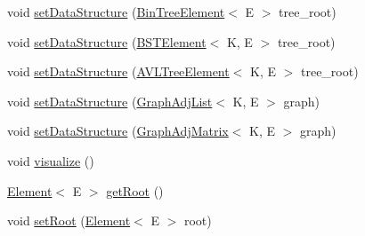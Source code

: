 \begin{DoxyCompactItemize}
void \hyperlink{classbridges_1_1connect_1_1_bridges_a02a3d74b381473b5d97a8f8194df9b40}{set\+Data\+Structure} (\hyperlink{classbridges_1_1base_1_1_bin_tree_element}{Bin\+Tree\+Element}$<$ E $>$ tree\+\_\+root)
\item 
void \hyperlink{classbridges_1_1connect_1_1_bridges_adb01a9385de48ef267bdfd22758fb361}{set\+Data\+Structure} (\hyperlink{classbridges_1_1base_1_1_b_s_t_element}{B\+S\+T\+Element}$<$ K, E $>$ tree\+\_\+root)
\item 
void \hyperlink{classbridges_1_1connect_1_1_bridges_a702c3f88840e100ad0182110627e60f5}{set\+Data\+Structure} (\hyperlink{classbridges_1_1base_1_1_a_v_l_tree_element}{A\+V\+L\+Tree\+Element}$<$ K, E $>$ tree\+\_\+root)
\item 
void \hyperlink{classbridges_1_1connect_1_1_bridges_aa5dc1d094955a486e649fdb05d66502f}{set\+Data\+Structure} (\hyperlink{classbridges_1_1base_1_1_graph_adj_list}{Graph\+Adj\+List}$<$ K, E $>$ graph)
\item 
void \hyperlink{classbridges_1_1connect_1_1_bridges_a1ac1f8a7c5e95500712c2edaa5e8971f}{set\+Data\+Structure} (\hyperlink{classbridges_1_1base_1_1_graph_adj_matrix}{Graph\+Adj\+Matrix}$<$ K, E $>$ graph)
\item 
void \hyperlink{classbridges_1_1connect_1_1_bridges_a6881ed6e3f3a1db1d3cda249eb8543a1}{visualize} ()
\item 
\hyperlink{classbridges_1_1base_1_1_element}{Element}$<$ E $>$ \hyperlink{classbridges_1_1connect_1_1_bridges_ad46be93cba155fa93fd9082d9d813466}{get\+Root} ()
\item 
void \hyperlink{classbridges_1_1connect_1_1_bridges_aa05295718a1fefa2917dbaf874c79415}{set\+Root} (\hyperlink{classbridges_1_1base_1_1_element}{Element}$<$ E $>$ root)
\end{DoxyCompactItemize}
